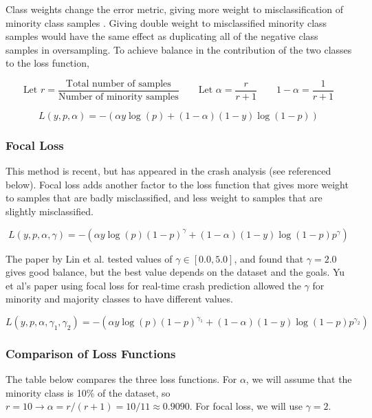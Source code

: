 Class weights change the error metric, giving more weight to misclassification of minority class samples \citep{edsjsr.2579163720010401}.  Giving double weight to misclassified minority class samples would have the same effect as duplicating all of the negative class samples in oversampling.  To achieve balance in the contribution of the two classes to the loss function,  

$$\text{Let } r = \frac{ \text{Total number of samples}}{\text{Number of minority samples}} \qquad  \text{Let } \alpha = \frac{r}{r+1} \qquad 1-\alpha = \frac{1}{r+1}$$



$$L(y,p,\alpha) = - 
	\left( 
		\alpha y \log \left( p \right) + 
		\left( 1-\alpha \right) \left( 1-y \right) \log \left( 1-p \right) 
	\right) 
$$


\subsubsection{Focal Loss}

This method is recent, but has appeared in the crash analysis (see \cite{YU2020102740} referenced below).  Focal loss \citep{lin2017focal} adds another factor to the loss function that gives more weight to samples that are badly misclassified, and less weight to samples that are slightly misclassified.  

$$L(y,p,\alpha, \gamma) = - 
	\left( 
		\alpha y \log \left( p \right)  \left( 1-p \right)^\gamma
		+ 
		\left( 1-\alpha \right) \left( 1-y \right) \log \left(1-p \right) p^\gamma 
	\right) 
$$

The paper by Lin et al. tested values of $\gamma \in [0.0, 5.0]$, and found that $\gamma = 2.0$ gives good balance, but the best value depends on the dataset and the goals.  Yu et al's paper using focal loss for real-time crash prediction allowed the $\gamma$ for minority and majority classes to have different values.  

$$L(y,p,\alpha, \gamma_1, \gamma_2) = - 
	\left( 
		\alpha y \log \left( p \right)  \left( 1-p \right)^{\gamma_1}
		+ 
		\left( 1-\alpha \right) \left( 1-y \right) \log \left(1-p \right) p^{\gamma_2}
	\right) 
$$

\subsubsection{Comparison of Loss Functions}

The table below compares the three loss functions.  For $\alpha$, we will assume that the minority class is 10\% of the dataset, so 
$r = 10 \to \alpha = r/(r+1)= 10/11 \approx 0.9090$.
For focal loss, we will use $\gamma = 2$.  

